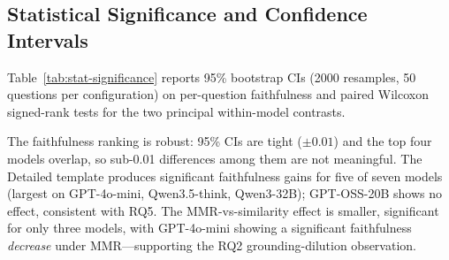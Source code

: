 \subsection{Statistical Significance and Confidence Intervals}
\label{subsec:stats}

Table~\ref{tab:stat-significance} reports 95\% bootstrap CIs (2000 resamples, 50 questions per configuration) on per-question faithfulness and paired Wilcoxon signed-rank tests for the two principal within-model contrasts.

\begin{table}[t]
\centering
\caption{Per-question bootstrap 95\% CIs and paired Wilcoxon $p$-values for template (Detailed$-$Concise) and retrieval (MMR$-$Similarity) effects. ***$p<0.001$, **$p<0.01$, *$p<0.05$, ns not significant.}
\label{tab:stat-significance}
\end{table}

The faithfulness ranking is robust: 95\% CIs are tight ($\pm 0.01$) and the top four models overlap, so sub-0.01 differences among them are not meaningful. The Detailed template produces significant faithfulness gains for five of seven models (largest on GPT-4o-mini, Qwen3.5-think, Qwen3-32B); GPT-OSS-20B shows no effect, consistent with RQ5. The MMR-vs-similarity effect is smaller, significant for only three models, with GPT-4o-mini showing a significant faithfulness \emph{decrease} under MMR---supporting the RQ2 grounding-dilution observation.

